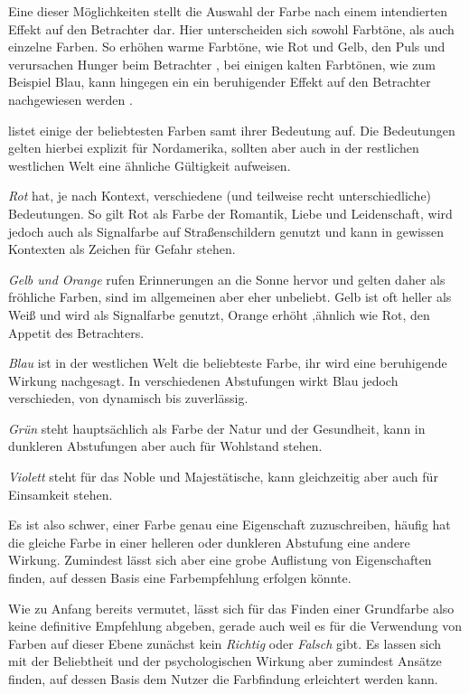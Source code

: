 Eine dieser Möglichkeiten stellt die Auswahl der Farbe nach einem intendierten Effekt auf den Betrachter dar.
Hier unterscheiden sich sowohl Farbtöne, als auch einzelne Farben.
So erhöhen warme Farbtöne, wie Rot und Gelb, den Puls und verursachen Hunger beim Betrachter \cite{berman2010street},
bei einigen kalten Farbtönen, wie zum Beispiel Blau, kann hingegen ein ein beruhigender Effekt auf den Betrachter nachgewiesen werden \cite{crozier1999meanings}.

\cite{berman2010street} listet einige der beliebtesten Farben samt ihrer Bedeutung auf. Die Bedeutungen gelten hierbei explizit für Nordamerika, sollten aber auch in der restlichen westlichen Welt eine ähnliche Gültigkeit aufweisen.

\textit{Rot} hat, je nach Kontext, verschiedene (und teilweise recht unterschiedliche) Bedeutungen. So gilt Rot als Farbe der Romantik, Liebe und Leidenschaft, wird jedoch auch als Signalfarbe auf Straßenschildern genutzt und kann in gewissen Kontexten als Zeichen für Gefahr stehen.

\textit{Gelb und Orange} rufen Erinnerungen an die Sonne hervor und gelten daher als fröhliche Farben, sind im allgemeinen aber eher unbeliebt. Gelb ist oft heller als Weiß und wird als Signalfarbe genutzt, Orange erhöht ,ähnlich wie Rot, den Appetit des Betrachters.

\textit{Blau} ist in der westlichen Welt die beliebteste Farbe, ihr wird eine beruhigende Wirkung nachgesagt. In verschiedenen Abstufungen wirkt Blau jedoch verschieden, von dynamisch bis zuverlässig.

\textit{Grün} steht hauptsächlich als Farbe der Natur und der Gesundheit, kann in dunkleren Abstufungen aber auch für Wohlstand stehen.

\textit{Violett} steht für das Noble und Majestätische, kann gleichzeitig aber auch für Einsamkeit stehen.

Es ist also schwer, einer Farbe genau eine Eigenschaft zuzuschreiben, häufig hat die gleiche Farbe in einer helleren oder dunkleren Abstufung eine andere Wirkung. Zumindest lässt sich aber eine grobe Auflistung von Eigenschaften finden, auf dessen Basis eine Farbempfehlung erfolgen könnte.

Wie zu Anfang bereits vermutet, lässt sich für das Finden einer Grundfarbe also keine definitive Empfehlung abgeben, gerade auch weil es für die Verwendung von Farben auf dieser Ebene zunächst kein \textit{Richtig} oder \textit{Falsch} gibt. Es lassen sich mit der Beliebtheit und der psychologischen Wirkung aber zumindest Ansätze finden, auf dessen Basis dem Nutzer die Farbfindung erleichtert werden kann.

